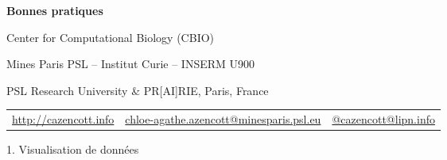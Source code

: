 \documentclass[sans,14pt]{beamer}
\author{Chlo\'e-Agathe~Azencott}
\date{\small Juin 2024}
\newcommand{\mytitle}{Bonnes pratiques}
\begin{document}
{
  \begin{frame}[plain]
    \selectfont
    \begin{center}
      {}
    \end{center}

    \vspace{100pt}

      {\Large \bf \mytitle}

      \insertauthor

      {\footnotesize
        \centerline{Center for Computational Biology (CBIO)}
      
        \centerline{Mines Paris PSL -- Institut Curie -- INSERM U900}

        \centerline{PSL Research University \& PR[AI]RIE, Paris, France}
      }

      \centerline {\insertdate}


      \vspace{-15pt}

      \begin{center}
        \begin{tabular}[b]{ccc}
          {\scriptsize \href{http://cazencott.info}{http://cazencott.info}} &
          {\scriptsize \href{chloe-agathe.azencott@minesparis.psl.eu}
            {chloe-agathe.azencott@minesparis.psl.eu}} & 
          {\scriptsize \href{https://lipn.info/@cazencott}{@cazencott@lipn.info}} \\
        \end{tabular}
      \end{center}
\end{frame}

\addtocounter{framenumber}{-1}

\begin{frame}
  \begin{center}
    \Large 1. Visualisation de données
  \end{center}
\end{frame}

}
\end{document}
